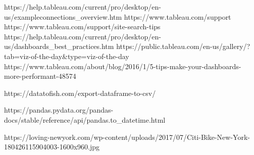 https://help.tableau.com/current/pro/desktop/en-us/exampleconnections_overview.htm
https://www.tableau.com/support
https://www.tableau.com/support/site-search-tips
https://help.tableau.com/current/pro/desktop/en-us/dashboards_best_practices.htm
https://public.tableau.com/en-us/gallery/?tab=viz-of-the-day&type=viz-of-the-day
https://www.tableau.com/about/blog/2016/1/5-tips-make-your-dashboards-more-performant-48574

https://datatofish.com/export-dataframe-to-csv/

https://pandas.pydata.org/pandas-docs/stable/reference/api/pandas.to_datetime.html

https://loving-newyork.com/wp-content/uploads/2017/07/Citi-Bike-New-York-180426115904003-1600x960.jpg

